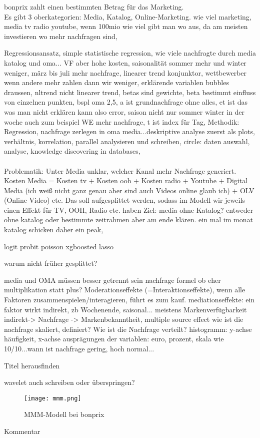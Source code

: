 bonprix zahlt einen bestimmten Betrag für das Marketing. \\ 
Es gibt 3 oberkategorien: Media, Katalog, Online-Marketing. wie viel marketing, media tv radio youtube, wenn 100mio wie viel gibt man wo aus, da am meisten investieren wo mehr nachfragen sind, 

Regressionsansatz, simple statistische regression, wie viele nachfragte durch media katalog und oma... VF aber hohe kosten, saisonalität sommer mehr und winter weniger, märz bis juli mehr nachfrage, linearer trend konjunktor, wettbewerber wenn andere mehr zahlen dann wir weniger, erklärende variablen bubbles draussen, nltrend nicht linearer trend, betas sind gewichte, beta bestimmt einfluss von einzelnen punkten, bspl oma 2,5, a ist grundnachfrage ohne alles, et ist das was man nicht erklären kann also error, saison nicht nur sommer winter in der woche auch zum beispiel WE mehr nachfrage, t ist index für Tag,
Methodik: Regression, nachfrage zerlegen in oma media...deskriptive analyse zuerst als plots, verhältnis, korrelation, parallel analysieren und schreiben, circle: daten auswahl, analyse, knowledge discovering in databases, \\ \\
Problematik: Unter Media unklar, welcher Kanal mehr Nachfrage generiert. Kosten Media = Kosten tv + Kosten ooh + Kosten radio + Youtube + Digital Media (ich weiß nicht ganz genau aber sind auch Videos online glaub ich) + OLV (Online Video) etc.
Das soll aufgesplittet werden, sodass im Modell wir jeweils einen Effekt für TV, OOH, Radio etc. haben
Ziel: media ohne Katalog? entweder ohne katalog oder bestimmte zeitrahmen aber am ende klären.  
ein mal im monat katalog schicken daher ein peak,

logit
probit
poisson
xgboosted
lasso

warum nicht früher gesplittet?

media und OMA müssen besser getrennt sein
nachfrage formel ob eher multiplikation statt plus? Moderationseffekte (=Interaktionseffekte), wenn alle Faktoren zusammenspielen/interagieren, führt es zum kauf.
mediationseffekte: ein faktor wirkt indirekt, zb Wochenende, saisonal... meistens Markenverfügbarkeit indirekt-> Nachfrage -> Markenbekanntheit, 
multiple source effect 
wie ist die nachfrage skaliert, definiert? Wie ist die Nachfrage verteilt?
histogramm: y-achse häufigkeit, x-achse ausprägungen der variablen: euro, prozent, skala wie 10/10...wann ist nachfrage gering, hoch normal...

Titel herausfinden

wavelet auch schreiben oder überspringen?


\begin{figure} [h]
    \centering
    \texttt{[image: mmm.png]}
    \caption{\ac{MMM}-Modell bei bonprix}
    \label{fig:mmm-label}
\end{figure}


Kommentar 
\fi
